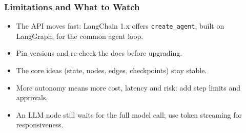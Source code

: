 \begin{frame}[fragile]\frametitle{Limitations and What to Watch}
      \begin{itemize}
        \item The API moves fast: LangChain 1.x offers \texttt{create\_agent}, built on LangGraph, for the common agent loop.
        \item Pin versions and re-check the docs before upgrading.
        \item The core ideas (state, nodes, edges, checkpoints) stay stable.
        \item More autonomy means more cost, latency and risk: add step limits and approvals.
        \item An LLM node still waits for the full model call; use token streaming for responsiveness.
      \end{itemize}
\end{frame}

